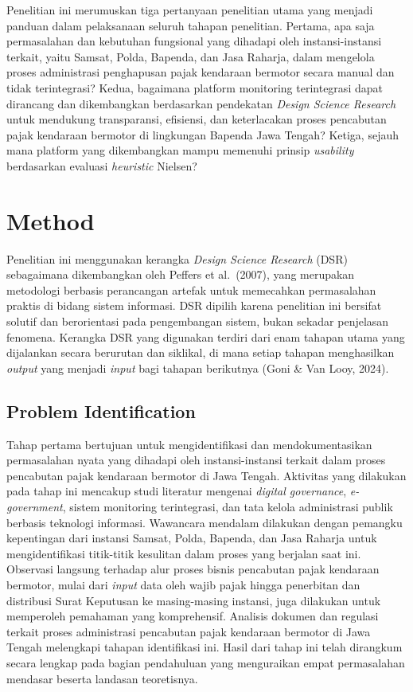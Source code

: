 \documentclass[conference]{IEEEtran}
\begin{document}
Penelitian ini merumuskan tiga pertanyaan penelitian utama yang menjadi panduan
dalam pelaksanaan seluruh tahapan penelitian. Pertama, apa saja permasalahan dan
kebutuhan fungsional yang dihadapi oleh instansi-instansi terkait, yaitu
Samsat, Polda, Bapenda, dan Jasa Raharja, dalam mengelola proses administrasi
penghapusan pajak kendaraan bermotor secara manual dan tidak terintegrasi?
Kedua, bagaimana platform monitoring terintegrasi dapat dirancang dan dikembangkan
berdasarkan pendekatan \emph{Design Science Research} untuk mendukung transparansi,
efisiensi, dan keterlacakan proses pencabutan pajak kendaraan bermotor di
lingkungan Bapenda Jawa Tengah? Ketiga, sejauh mana platform yang dikembangkan
mampu memenuhi prinsip \emph{usability} berdasarkan evaluasi \emph{heuristic} Nielsen?

\section{Method}
\label{sec:method}

Penelitian ini menggunakan kerangka \emph{Design Science Research} (DSR)
sebagaimana dikembangkan oleh Peffers et al.~(2007), yang merupakan metodologi
berbasis perancangan artefak untuk memecahkan permasalahan praktis di bidang
sistem informasi. DSR dipilih karena penelitian ini bersifat solutif dan
berorientasi pada pengembangan sistem, bukan sekadar penjelasan fenomena.
Kerangka DSR yang digunakan terdiri dari enam tahapan utama yang dijalankan
secara berurutan dan siklikal, di mana setiap tahapan menghasilkan \emph{output}
yang menjadi \emph{input} bagi tahapan berikutnya (Goni \& Van Looy, 2024).

\subsection{Problem Identification}
\label{subsec:problem-identification}

Tahap pertama bertujuan untuk mengidentifikasi dan mendokumentasikan
permasalahan nyata yang dihadapi oleh instansi-instansi terkait dalam proses
pencabutan pajak kendaraan bermotor di Jawa Tengah. Aktivitas yang dilakukan
pada tahap ini mencakup studi literatur mengenai \emph{digital governance},
\emph{e-government}, sistem monitoring terintegrasi, dan tata kelola administrasi
publik berbasis teknologi informasi. Wawancara mendalam dilakukan dengan
pemangku kepentingan dari instansi Samsat, Polda, Bapenda, dan Jasa Raharja
untuk mengidentifikasi titik-titik kesulitan dalam proses yang berjalan saat
ini. Observasi langsung terhadap alur proses bisnis pencabutan pajak kendaraan
bermotor, mulai dari \emph{input} data oleh wajib pajak hingga penerbitan dan
distribusi Surat Keputusan ke masing-masing instansi, juga dilakukan untuk
memperoleh pemahaman yang komprehensif. Analisis dokumen dan regulasi terkait
proses administrasi pencabutan pajak kendaraan bermotor di Jawa Tengah melengkapi
tahapan identifikasi ini. Hasil dari tahap ini telah dirangkum secara lengkap
pada bagian pendahuluan yang menguraikan empat permasalahan mendasar beserta
landasan teoretisnya.
\end{document}
